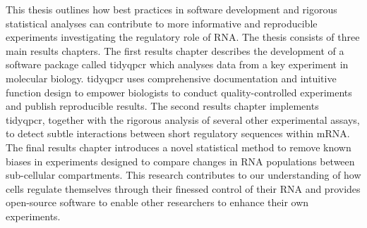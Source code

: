 \documentclass[../main.tex]{subfiles}
\begin{document}
This thesis outlines how best practices in software development and rigorous statistical analyses can contribute to more informative and reproducible experiments investigating the regulatory role of RNA.
The thesis consists of three main results chapters.
The first results chapter describes the development of a software package called tidyqpcr which analyses data from a key experiment in molecular biology.
tidyqpcr uses comprehensive documentation and intuitive function design to empower biologists to conduct quality-controlled experiments and publish reproducible results.
The second results chapter implements tidyqpcr, together with the rigorous analysis of several other experimental assays, to detect subtle interactions between short regulatory sequences within mRNA.
The final results chapter introduces a novel statistical method to remove known biases in experiments designed to compare changes in RNA populations between sub-cellular compartments.
This research contributes to our understanding of how cells regulate themselves through their finessed control of their RNA and provides open-source software to enable other researchers to enhance their own experiments.
\end{document}
